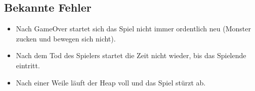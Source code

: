 \documentclass[12pt]{article}
\begin{document}
\subsection{Bekannte Fehler}
	\begin{itemize}
		\item Nach GameOver startet sich das Spiel nicht immer ordentlich neu (Monster zucken und bewegen sich nicht).
		\item Nach dem Tod des Spielers startet die Zeit nicht wieder, bis das Spielende eintritt.
		\item Nach einer Weile läuft der Heap voll und das Spiel stürzt ab.
	\end{itemize}
\newpage
{}


\end{document}
